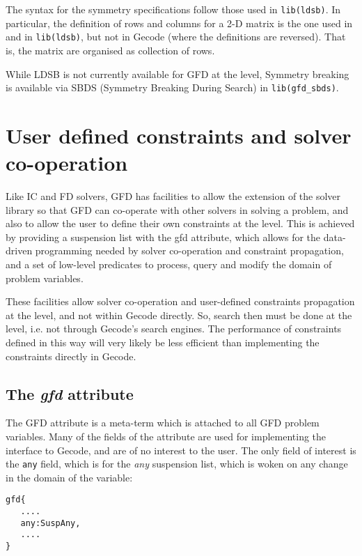The syntax for the symmetry specifications follow those used in
\texttt{lib(ldsb)}. In particular, the definition of rows and columns 
for a 2-D matrix is the one used in \eclipse and in 
\texttt{lib(ldsb)}, but not in Gecode (where the definitions are reversed).
That is, the matrix are organised as collection of rows.

While LDSB is not currently available for GFD at the \eclipse level, Symmetry
breaking is available via SBDS
(Symmetry Breaking During Search) in \texttt{lib(gfd_sbds)}.

\section{User defined constraints and solver co-operation}
Like IC and FD solvers, GFD has facilities to allow the extension of the 
solver library so that GFD can co-operate with other solvers in solving a
problem, and also to allow the user to define their own constraints at the {\eclipse}
level. This is achieved by providing a suspension list with the gfd attribute,
which allows for the data-driven programming needed by solver co-operation and
constraint propagation, and a set of low-level predicates to process,
 query and  modify the domain of problem variables.

These facilities allow solver co-operation and user-defined 
constraints propagation at the {\eclipse} level, and not within Gecode directly.
So, search then must be done at the {\eclipse} level, i.e. not through Gecode's
search engines. The performance of constraints defined in this way will very
likely be less efficient than implementing the constraints directly in Gecode.

\subsection{The {\it gfd\/} attribute}

The GFD attribute is a meta-term which is attached to all GFD problem variables.
Many of the fields of the attribute are used for implementing the interface to
Gecode, and are of no interest to the user. The only field of interest is the
{\tt any} field, which is for the {\it any\/} suspension list, which is woken on 
any change in the domain of the variable:

\begin{verbatim}
gfd{
   ....
   any:SuspAny,
   ....
}
\end{verbatim}

